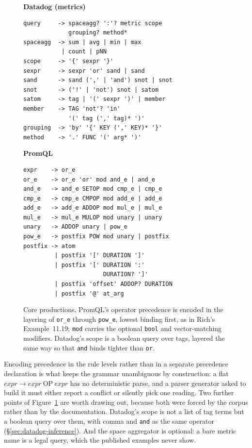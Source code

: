 \begin{figure}[htbp]\centering\footnotesize
\begin{minipage}{0.47\linewidth}
\textbf{Datadog (metrics)}
\begin{lstlisting}
query     -> spaceagg? ':'? metric scope
             grouping? method*
spaceagg  -> sum | avg | min | max
           | count | pNN
scope     -> '{' sexpr '}'
sexpr     -> sexpr 'or' sand | sand
sand      -> sand (',' | 'and') snot | snot
snot      -> ('!' | 'not') snot | satom
satom     -> tag | '(' sexpr ')' | member
member    -> TAG 'not'? 'in'
             '(' tag (',' tag)* ')'
grouping  -> 'by' '{' KEY (',' KEY)* '}'
method    -> '.' FUNC '(' arg* ')'
\end{lstlisting}
\end{minipage}\hfill
\begin{minipage}{0.47\linewidth}
\textbf{PromQL}
\begin{lstlisting}
expr    -> or_e
or_e    -> or_e 'or' mod and_e | and_e
and_e   -> and_e SETOP mod cmp_e | cmp_e
cmp_e   -> cmp_e CMPOP mod add_e | add_e
add_e   -> add_e ADDOP mod mul_e | mul_e
mul_e   -> mul_e MULOP mod unary | unary
unary   -> ADDOP unary | pow_e
pow_e   -> postfix POW mod unary | postfix
postfix -> atom
         | postfix '[' DURATION ']'
         | postfix '[' DURATION ':'
                       DURATION? ']'
         | postfix 'offset' ADDOP? DURATION
         | postfix '@' at_arg
\end{lstlisting}
\end{minipage}
\caption{Core productions. PromQL's operator precedence is encoded in the layering of
\texttt{or\_e} through \texttt{pow\_e}, lowest binding first, as in Rich's
Example~11.19; \texttt{mod} carries the optional \texttt{bool} and vector-matching
modifiers. Datadog's scope is a boolean query over tags, layered the same way so that
\texttt{and} binds tighter than \texttt{or}.}
\label{fig:productions}
\end{figure}

Encoding precedence in the rule levels rather than in a separate precedence declaration
is what keeps the grammar unambiguous by construction: a flat
$\mathit{expr} \rightarrow \mathit{expr}\ \mathrm{OP}\ \mathit{expr}$ has no
deterministic parse, and a parser generator asked to build it must either report a
conflict or silently pick one reading. Two further points of Figure~\ref{fig:productions}
are worth drawing out, because both were forced by the corpus rather than by the
documentation. Datadog's scope is not a list of tag terms but a boolean query over them,
with comma and \texttt{and} as the same operator (\S\ref{sec:datadog-inference}). And the
space aggregator is optional: a bare metric name is a legal query, which the published
examples never show.


